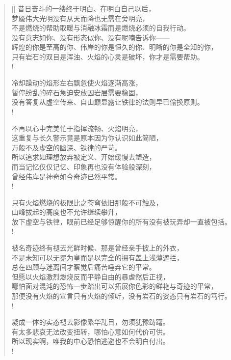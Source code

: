 \documentclass[UTF8, 12pt, a4paper]{ctexrep} %
\begin{document}
\begin{verse}[\versewidth]
昔日奋斗的一缕终于明白、在明白自己以后，\\
梦魇伟大光明没有从天而降也无需在旁明亮，\\
不是燃烧的帮助取暖与消融冰霜而是燃烧必须的自我行动。\\
没有意志如你、没有形态似你、没有呢喃告诉你——\\
辉煌的你是至高的你、伟岸的你是恒久的你、明晰的你是全知的你，\\
只有岩石的双目是浑浊、火焰的心灵是破坏，你才是需要帮助。\\!

冷却躁动的焰形左右飘忽使火焰逐渐高涨，\\
暂停纷乱的碎石急迫安放因岩层需要稳固，\\
没有答复从虚空传来、自山巅显露让铁律的法则早已偷换原则。\\!

不再以心中完美忙于指挥流畅、火焰明亮，\\
这重复与长久警示竟是原本因为你认识如此简陋，\\
万般不及虚空的幽深、铁律的严苛。\\
所以追求如理想放弃被定义、开始缓慢去塑造，\\
而当记忆仅仅记忆、印象再也没有体验般深刻，\\
曾经伟岸是神奇如今奇迹已然平常。\\!

只有火焰燃烧的极限比之苍穹依旧那般不可触及，\\
山峰拔起的高度也不允许继续攀升，\\
放下虚空与铁律，眼前已经足够惊醒你的所有没有被玩弄却一直被包括。\\!

被名奇迹终有褪去光鲜时候、那是曾经亲手披上的外衣，\\
不是未知可以无冕为皇而是以完全的拥有盖上浅薄遮拦，\\
总在四顾与迷离间才察觉后痛苦唾弃它的平常。\\
但愿以火焰激烈燃烧反而平静自由的暴虐然后正视，\\
哪怕面对混沌的恐怖一步踏出可以拓展你色彩的鲜艳与奇迹的平常，\\
那便没有火焰的宣言只有火焰的倾听，没有岩石的姿态只有岩石的笃行。\\!

凝成一体的实态褪去影像繁华乱目，勿须犹豫踌躇。\\
有太多悲哀无法改变扭转，哪怕心意如何代价可供。\\
所以现实啊，唯我的中心恐怕逃避也不会明白付出。\\!


\end{verse}
\end{document}
